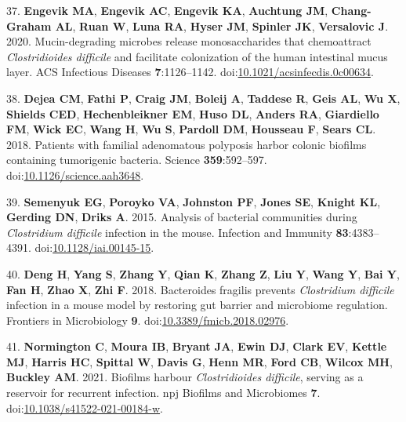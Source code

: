 \documentclass[
  11pt,
]{article}
\begin{document}
\leavevmode\hypertarget{ref-Engevik2020}{}%
37. \textbf{Engevik MA}, \textbf{Engevik AC}, \textbf{Engevik KA},
\textbf{Auchtung JM}, \textbf{Chang-Graham AL}, \textbf{Ruan W},
\textbf{Luna RA}, \textbf{Hyser JM}, \textbf{Spinler JK},
\textbf{Versalovic J}. 2020. Mucin-degrading microbes release
monosaccharides that chemoattract \emph{Clostridioides difficile} and
facilitate colonization of the human intestinal mucus layer. ACS
Infectious Diseases \textbf{7}:1126--1142.
doi:\href{https://doi.org/10.1021/acsinfecdis.0c00634}{10.1021/acsinfecdis.0c00634}.

\leavevmode\hypertarget{ref-Dejea2018}{}%
38. \textbf{Dejea CM}, \textbf{Fathi P}, \textbf{Craig JM},
\textbf{Boleij A}, \textbf{Taddese R}, \textbf{Geis AL}, \textbf{Wu X},
\textbf{Shields CED}, \textbf{Hechenbleikner EM}, \textbf{Huso DL},
\textbf{Anders RA}, \textbf{Giardiello FM}, \textbf{Wick EC},
\textbf{Wang H}, \textbf{Wu S}, \textbf{Pardoll DM}, \textbf{Housseau
F}, \textbf{Sears CL}. 2018. Patients with familial adenomatous
polyposis harbor colonic biofilms containing tumorigenic bacteria.
Science \textbf{359}:592--597.
doi:\href{https://doi.org/10.1126/science.aah3648}{10.1126/science.aah3648}.

\leavevmode\hypertarget{ref-Semenyuk2015}{}%
39. \textbf{Semenyuk EG}, \textbf{Poroyko VA}, \textbf{Johnston PF},
\textbf{Jones SE}, \textbf{Knight KL}, \textbf{Gerding DN},
\textbf{Driks A}. 2015. Analysis of bacterial communities during
\emph{Clostridium difficile} infection in the mouse. Infection and
Immunity \textbf{83}:4383--4391.
doi:\href{https://doi.org/10.1128/iai.00145-15}{10.1128/iai.00145-15}.

\leavevmode\hypertarget{ref-Deng2018}{}%
40. \textbf{Deng H}, \textbf{Yang S}, \textbf{Zhang Y}, \textbf{Qian K},
\textbf{Zhang Z}, \textbf{Liu Y}, \textbf{Wang Y}, \textbf{Bai Y},
\textbf{Fan H}, \textbf{Zhao X}, \textbf{Zhi F}. 2018. Bacteroides
fragilis prevents \emph{Clostridium difficile} infection in a mouse
model by restoring gut barrier and microbiome regulation. Frontiers in
Microbiology \textbf{9}.
doi:\href{https://doi.org/10.3389/fmicb.2018.02976}{10.3389/fmicb.2018.02976}.

\leavevmode\hypertarget{ref-Normington2021}{}%
41. \textbf{Normington C}, \textbf{Moura IB}, \textbf{Bryant JA},
\textbf{Ewin DJ}, \textbf{Clark EV}, \textbf{Kettle MJ}, \textbf{Harris
HC}, \textbf{Spittal W}, \textbf{Davis G}, \textbf{Henn MR},
\textbf{Ford CB}, \textbf{Wilcox MH}, \textbf{Buckley AM}. 2021.
Biofilms harbour \emph{Clostridioides difficile}, serving as a reservoir
for recurrent infection. npj Biofilms and Microbiomes \textbf{7}.
doi:\href{https://doi.org/10.1038/s41522-021-00184-w}{10.1038/s41522-021-00184-w}.
\end{document}
